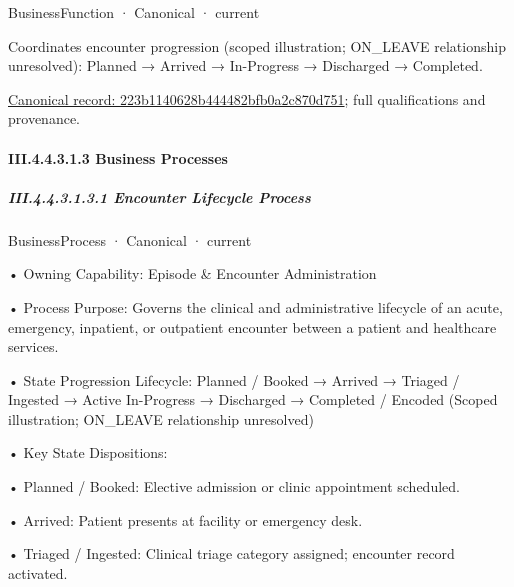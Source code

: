\label{element:223b1140628b444482bfb0a2c870d751}
{\small BusinessFunction · Canonical · current}\par

Coordinates encounter progression (scoped illustration; ON\_LEAVE relationship unresolved): Planned → Arrived → In-Progress → Discharged → Completed.


{\footnotesize \href{../../../../../../../../continuum/business/business-function/223b1140628b444482bfb0a2c870d751.md}{Canonical record: 223b1140628b444482bfb0a2c870d751}; full qualifications and provenance.}\par
\paragraph*{III.4.4.3.1.3 Business Processes}
\label{navigation:III.4.4.3.1.3}

\subparagraph*{III.4.4.3.1.3.1 Encounter Lifecycle Process}
\label{navigation:III.4.4.3.1.3.1}

\label{element:df49e2e8bb3748f3abbdd1c28ae1be8f}
{\small BusinessProcess · Canonical · current}\par

•
Owning Capability: Episode \& Encounter Administration



•
Process Purpose: Governs the clinical and administrative lifecycle of an acute, emergency, inpatient, or outpatient encounter between a patient and healthcare services.



•
State Progression Lifecycle: Planned / Booked → Arrived → Triaged / Ingested → Active In-Progress → Discharged → Completed / Encoded   (Scoped illustration; ON\_LEAVE relationship unresolved)



•
Key State Dispositions:



•
Planned / Booked: Elective admission or clinic appointment scheduled.



•
Arrived: Patient presents at facility or emergency desk.



•
Triaged / Ingested: Clinical triage category assigned; encounter record activated.



